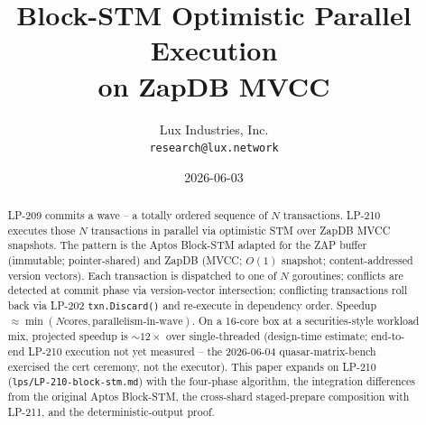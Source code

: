 \documentclass[11pt,a4paper]{article}
\title{Block-STM Optimistic Parallel Execution\\
       on ZapDB MVCC}
\author{Lux Industries, Inc. \\
        \texttt{research@lux.network}}
\date{2026-06-03}
\begin{document}
\luxcoverpage

\begin{abstract}
LP-209 commits a wave -- a totally ordered sequence of $N$
transactions. LP-210 executes those $N$ transactions in parallel via
optimistic STM over ZapDB MVCC snapshots. The pattern is the Aptos
Block-STM \cite{blockstm2022} adapted for the ZAP buffer (immutable;
pointer-shared) and ZapDB (MVCC; $O(1)$ snapshot; content-addressed
version vectors). Each transaction is dispatched to one of $N$
goroutines; conflicts are detected at commit phase via version-vector
intersection; conflicting transactions roll back via LP-202
\texttt{txn.Discard()} and re-execute in dependency order. Speedup
$\approx \min(N\text{cores}, \text{parallelism-in-wave})$. On a
16-core box at a securities-style workload mix, projected speedup is
$\sim 12\times$ over single-threaded (design-time estimate;
end-to-end LP-210 execution not yet measured -- the 2026-06-04
quasar-matrix-bench exercised the cert ceremony, not the executor).
This paper expands on LP-210
(\texttt{lps/LP-210-block-stm.md}) with the four-phase algorithm,
the integration differences from the original Aptos Block-STM,
the cross-shard staged-prepare composition with LP-211, and the
deterministic-output proof.
\end{abstract}

\tableofcontents
\newpage









\end{document}

